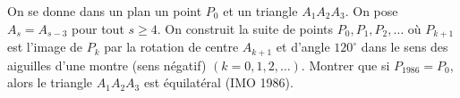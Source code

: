 On se donne dans un plan un point $P_0$ et un triangle $A_1A_2A_3$. On pose $A_s = A_{s-3}$ pour tout $s \geq 4$. On construit la suite de points $P_0, P_1, P_2, \ldots$ où $P_{k+1}$ est l'image de $P_k$ par la rotation de centre $A_{k+1}$ et d'angle $120^\circ$ dans le sens des aiguilles d'une montre (sens négatif) $(k = 0, 1, 2, \ldots)$. Montrer que si $P_{1986} = P_0$, alors le triangle $A_1A_2A_3$ est équilatéral (IMO 1986).
